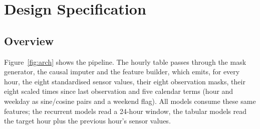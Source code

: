 \section{Design Specification}\label{sec:design}

\subsection{Overview}
Figure~\ref{fig:arch} shows the pipeline. The hourly table passes through the mask generator, the causal imputer and the feature builder, which emits, for every hour, the eight standardised sensor values, their eight observation masks, their eight scaled times since last observation and five calendar terms (hour and weekday as sine/cosine pairs and a weekend flag). All models consume these same features; the recurrent models read a 24-hour window, the tabular models read the target hour plus the previous hour's sensor values.

